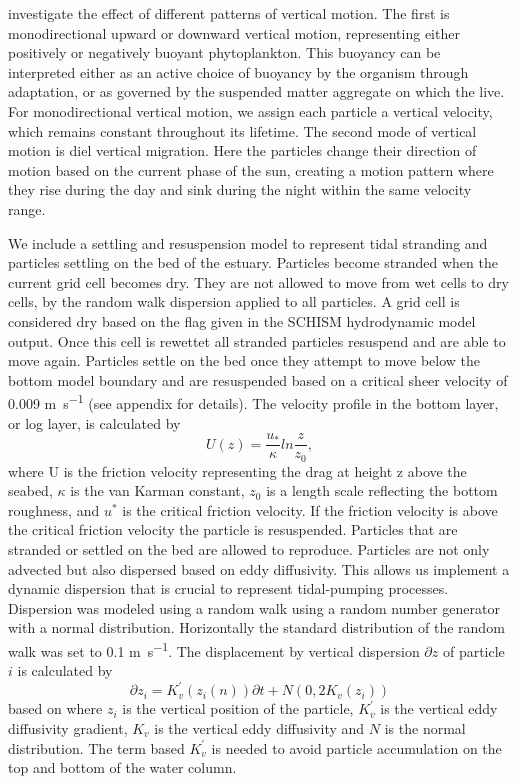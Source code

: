 \documentclass[npg, manuscript]{copernicus}
\begin{document}
investigate the effect of different patterns of vertical motion.
The first is monodirectional upward or downward vertical motion, representing either positively or negatively buoyant phytoplankton.
This buoyancy can be interpreted either as an active choice of buoyancy by the organism through adaptation, or as governed by the suspended matter aggregate on which the live.
For monodirectional vertical motion, we assign each particle a vertical velocity, which remains constant throughout its lifetime.
The second mode of vertical motion is diel vertical migration.
Here the particles change their direction of motion based on the current phase of the sun, creating a motion pattern where they rise during the day and sink during the night within the same velocity range.

We include a settling and resuspension model to represent tidal stranding and particles settling on the bed of the estuary.
Particles become stranded when the current grid cell becomes dry. 
They are not allowed to move from wet cells to dry cells, by the random walk dispersion applied to all particles.
A grid cell is considered dry based on the flag given in the SCHISM  hydrodynamic model output.
Once this cell is rewettet all stranded particles resuspend and are able to move again.
Particles settle on the bed once they attempt to move below the bottom model boundary and are resuspended based on a critical sheer velocity of 0.009 \unit{m s^{-1}} (see appendix for details).
The velocity profile in the bottom layer, or log layer, is calculated by
\begin{equation}
    U(z) = \frac{u_{*}}{\kappa} ln \frac{z}{z_{0}},
\end{equation}
where U is the friction velocity representing the drag at height z  above the seabed, $\kappa$ is the van Karman constant, $z_{0}$ is a length
scale reflecting the bottom roughness, and $u^{*}$ is the critical friction velocity.
If the friction velocity is above the critical friction velocity the particle is resuspended.
Particles that are stranded or settled on the bed are allowed to reproduce.
Particles are not only advected but also dispersed based on eddy diffusivity.
This allows us implement a dynamic dispersion that is crucial to represent tidal-pumping processes.
Dispersion was modeled using a random walk using a random number generator with a normal distribution.
Horizontally the standard distribution of the random walk was set to 0.1 \unit{m s^{-1}}.
The displacement by vertical dispersion $\partial z$ of particle $i$ is calculated by
\begin{equation}
    \partial z_{i} = K_{v}^{'}(z_{i}(n))\partial t + N(0, 2K_{v}(z_{i}))
\end{equation}
based on \citep{Yamazaki2014} where $z_{i}$ is the vertical position of the particle, $K_{v}^{'}$ is the vertical eddy diffusivity gradient, $K_{v}$ is the vertical eddy diffusivity and $N$ is the normal distribution.
The term based $K_{v}^{'}$ is needed to avoid particle accumulation on the top and bottom of the water column.
\end{document}

